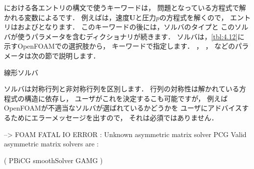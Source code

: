 における各エントリの構文で使うキーワードは，
問題となっている方程式で解かれる変数によるです．
例えばは，速度$\bm{U}$と圧力$p$の方程式を解くので，
エントリはおよびとなります．
このキーワードの後には，ソルバのタイプと
このソルバが使うパラメータを含むディクショナリが続きます．
ソルバは，\autoref{tbl:4.12}に示すOpenFOAMでの選択肢から，
%
%
キーワードで指定します．
%
%
，
%
%
，
%
%
などのパラメータは次の節で説明します．


\begin{table}[ht]
 
 \caption{線形ソルバ}
 \label{tbl:4.12}
\end{table}


ソルバは対称行列と非対称行列を区別します．
行列の対称性は解かれている方程式の構造に依存し，
ユーザがこれを決定するこも可能ですが，
例えばOpenFOAMが不適当なソルバが選ばれているかどうかを
ユーザにアドバイスするためにエラーメッセージを出すので，
それは必須ではありません．
\begin{OFverbatim}[terminal]
--> FOAM FATAL IO ERROR : Unknown asymmetric matrix solver PCG
Valid asymmetric matrix solvers are :

(
PBiCG
smoothSolver
GAMG
)
\end{OFverbatim}

